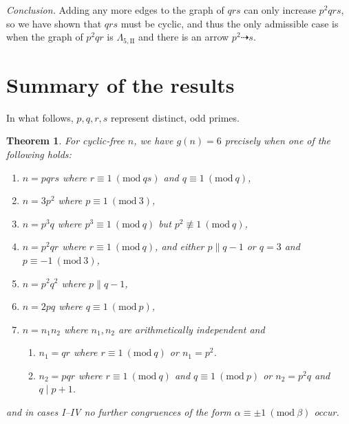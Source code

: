 \documentclass{article}
\newcommand{\Mod}[1]{\ (\mathrm{mod} \ #1)}
\newcommand{\qlamz}{\Lambda_{5,\text{II}}}
\theoremstyle{plain}
\newtheorem{thm}{Theorem}[section]
\theoremstyle{definition}
\begin{document}
\emph{Conclusion.} Adding any more edges to the graph of $qrs$ can only increase $p^2 q r s$, so we have shown that $qrs$ must be cyclic, and thus the only admissible case is when the graph of $p^2 q r$ is $\qlamz$ and there is an arrow $p^2 \dashrightarrow s$.

\section{Summary of the results}
In what follows, $p, q, r, s$ represent distinct, odd primes.
\nopagebreak
{}
\begin{thm}
	For cyclic-free $n$, we have $g(n) = 6$ precisely when one of the following holds:
	\begin{enumerate} \listspace
		\item $n = pqrs$ where $r \equiv 1 \Mod{qs}$ and $q \equiv 1 \Mod{q}$,
		\item $n = 3p^2$ where $p \equiv 1 \Mod{3}$,
		\item $n = p^3 q$ where $p^3 \equiv 1 \Mod{q}$ but $p^2 \not\equiv 1 \Mod{q}$,
		\item $n = p^2 q r$ where $r \equiv 1 \Mod{q}$, and either $p \parallel q - 1$ or $q = 3$ and $p \equiv -1 \Mod{3}$,
		\item $n = p^2 q^2$ where $p \parallel q - 1$,
		\item $n = 2pq$ where $q \equiv 1 \Mod{p}$,
		\item $n = n_1 n_2$ where $n_1, n_2$ are arithmetically independent and
		\begin{enumerate}
			\item $n_1 = qr$ where $r \equiv 1 \Mod{q}$ or $n_1 = p^2$.
			\item $n_2 = pqr$ where $r \equiv 1 \Mod{q}$ and $q \equiv 1 \Mod{p}$ or $n_2 = p^2 q$ and $q \mid p + 1$.
		\end{enumerate}
	\end{enumerate} \textspace
	and in cases I--IV no further congruences of the form $\alpha \equiv \pm 1 \Mod{\beta}$ \nolinebreak[4] \mbox{occur}.
\end{thm}
\end{document}
